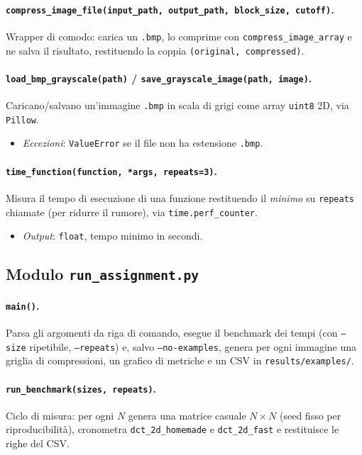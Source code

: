 \documentclass[11pt,a4paper]{article}
\begin{document}
\paragraph{\texttt{compress\_image\_file(input\_path, output\_path, block\_size, cutoff)}.}
Wrapper di comodo: carica un \texttt{.bmp}, lo comprime con
\texttt{compress\_image\_array} e ne salva il risultato, restituendo la coppia
\texttt{(original, compressed)}.

\paragraph{\texttt{load\_bmp\_grayscale(path)} / \texttt{save\_grayscale\_image(path, image)}.}
Caricano/salvano un'immagine \texttt{.bmp} in scala di grigi come array
\texttt{uint8} 2D, via \texttt{Pillow}.
\begin{itemize}
  \item \emph{Eccezioni}: \texttt{ValueError} se il file non ha estensione
        \texttt{.bmp}.
\end{itemize}

\paragraph{\texttt{time\_function(function, *args, repeats=3)}.}
Misura il tempo di esecuzione di una funzione restituendo il \emph{minimo} su
\texttt{repeats} chiamate (per ridurre il rumore), via
\texttt{time.perf\_counter}.
\begin{itemize}
  \item \emph{Output}: \texttt{float}, tempo minimo in secondi.
\end{itemize}

\subsection{Modulo \texttt{run\_assignment.py}}

\paragraph{\texttt{main()}.}
Parsa gli argomenti da riga di comando, esegue il benchmark dei tempi (con
\texttt{--size} ripetibile, \texttt{--repeats}) e, salvo \texttt{--no-examples},
genera per ogni immagine una griglia di compressioni, un grafico di metriche e
un CSV in \texttt{results/examples/}.

\paragraph{\texttt{run\_benchmark(sizes, repeats)}.}
Ciclo di misura: per ogni $N$ genera una matrice casuale $N\times N$ (seed
fisso per riproducibilità), cronometra \texttt{dct\_2d\_homemade} e
\texttt{dct\_2d\_fast} e restituisce le righe del CSV.
\end{document}
